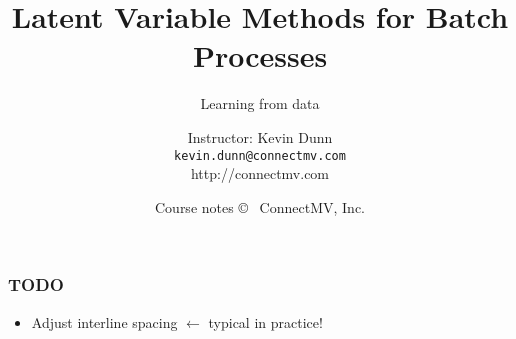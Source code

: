 \documentclass[handout, 12pt]{beamer}
\title[]{Latent Variable Methods for Batch Processes}
\subtitle[]{Learning from data}
\author[]{Instructor: Kevin Dunn \\{\tt kevin.dunn@connectmv.com}\\ http://connectmv.com}
\institute[]{}
\date[]{Course notes \copyright~ ConnectMV, Inc. \\ \vspace{1cm}{\footnotesize Presented at GSK, Mississauga, February 2011}}
\begin{document}
\begin{frame}
\titlepage
\end{frame}

\begin{frame}\frametitle{TODO}



\begin{itemize}
	\item	Adjust interline spacing  \hfill {\color{myOrange} $\leftarrow$ typical in practice!}
\end{itemize}
\end{frame}
\end{document}
